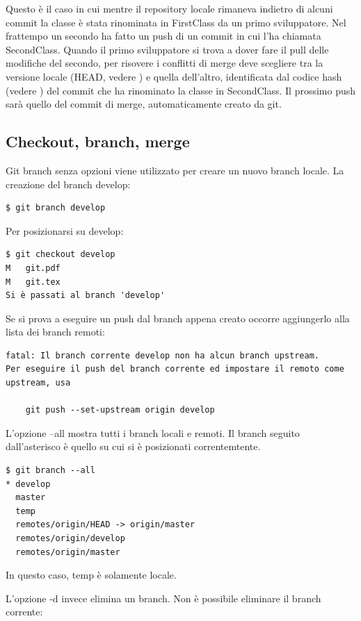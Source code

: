 \documentclass{article}
\begin{document}
Questo è il caso in cui mentre il repository locale rimaneva indietro di alcuni
commit la classe è stata rinominata in FirstClass da un primo sviluppatore. Nel
frattempo un secondo ha fatto un push di un commit in cui l'ha chiamata
SecondClass. Quando il primo sviluppatore si trova a dover fare il pull delle modifiche del
secondo, per risovere i conflitti di merge deve scegliere tra la versione locale
(HEAD, vedere ) e quella dell'altro, identificata dal codice hash
(vedere ) del commit che ha rinominato la classe in SecondClass.
Il prossimo push sarà quello del commit di merge, automaticamente creato da git.

\subsection{Checkout, branch, merge}
Git branch senza opzioni viene utilizzato per creare un nuovo branch locale. La
creazione del branch develop:

\begin{verbatim}
$ git branch develop
\end{verbatim}

Per posizionarsi su develop:

\begin{verbatim}
$ git checkout develop
M	git.pdf
M	git.tex
Si è passati al branch 'develop'
\end{verbatim}

Se si prova a eseguire un push dal branch appena creato occorre
aggiungerlo alla lista dei branch remoti:

\begin{verbatim}
fatal: Il branch corrente develop non ha alcun branch upstream.
Per eseguire il push del branch corrente ed impostare il remoto come upstream, usa

    git push --set-upstream origin develop
\end{verbatim}

L'opzione --all mostra tutti i branch locali e remoti. Il branch seguito
dall'asterisco è quello su cui si è posizionati correntemtente.

\begin{verbatim}
$ git branch --all
* develop
  master
  temp
  remotes/origin/HEAD -> origin/master
  remotes/origin/develop
  remotes/origin/master
\end{verbatim}

In questo caso, temp è solamente locale.

L'opzione -d invece elimina un branch. Non è possibile eliminare il branch corrente:
\end{document}
